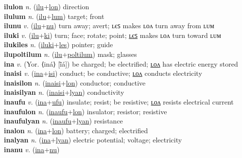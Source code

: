 \textbf{ilulon} \textit{n.} (\hyperref[ilu]{ilu}+\hyperref[lon]{lon})
direction \label{ilulon} \\
\textbf{ilulum} \textit{n.} (\hyperref[ilu]{ilu}+\hyperref[lum]{lum})
target; front \label{ilulum} \\
\textbf{ilunu} \textit{v.} (\hyperref[ilu]{ilu}+\hyperref[nu]{nu})
turn away; avert; ʟєꜱ makes ʟᴏᴧ turn away from ʟᴜᴍ \label{ilunu} \\
\textbf{iluki} \textit{v.} (\hyperref[ilu]{ilu}+\hyperref[ki]{ki})
turn; face; rotate; point; \hyperref[ilukiles]{ʟєꜱ} makes ʟᴏᴧ turn toward ʟᴜᴍ \label{iluki} \\
\textbf{ilukiles} \textit{n.} (\hyperref[iluki]{iluki}+\hyperref[les]{les})
pointer; guide \label{ilukiles} \\
\textbf{ilupoltilum} \textit{n.} (\hyperref[ilu]{ilu}+\hyperref[poltilum]{poltilum})
mask; glasses \label{ilupoltilum} \\
\textbf{ina} \textit{v.} (Yor. ⟨iná⟩ [ĩ̄á])
be charged; be electrified; \hyperref[inalon]{ʟᴏᴧ} has electric energy stored \label{ina} \\
\textbf{inaisi} \textit{v.} (\hyperref[ina]{ina}+\hyperref[isi]{isi})
conduct; be conductive; \hyperref[inaisilon]{ʟᴏᴧ} conducts electricity \label{inaisi} \\
\textbf{inaisilon} \textit{n.} (\hyperref[inaisi]{inaisi}+\hyperref[lon]{lon})
conductor; conductive \label{inaisilon} \\
\textbf{inaisilyan} \textit{n.} (\hyperref[inaisi]{inaisi}+\hyperref[lyan]{lyan})
conductivity \label{inaisilyan} \\
\textbf{inaufu} \textit{v.} (\hyperref[ina]{ina}+\hyperref[ufu]{ufu})
insulate; resist; be resistive; \hyperref[inaufulon]{ʟᴏᴧ} resists electrical current \label{inaufu} \\
\textbf{inaufulon} \textit{n.} (\hyperref[inaufu]{inaufu}+\hyperref[lon]{lon})
insulator; resistor; resistive \label{inaufulon} \\
\textbf{inaufulyan} \textit{n.} (\hyperref[inaufu]{inaufu}+\hyperref[lyan]{lyan})
resistance \label{inaufulyan} \\
\textbf{inalon} \textit{n.} (\hyperref[ina]{ina}+\hyperref[lon]{lon})
battery; charged; electrified \label{inalon} \\
\textbf{inalyan} \textit{n.} (\hyperref[ina]{ina}+\hyperref[lyan]{lyan})
electric potential; voltage; electricity \label{inalyan} \\
\textbf{inanu} \textit{v.} (\hyperref[ina]{ina}+\hyperref[nu]{nu})
